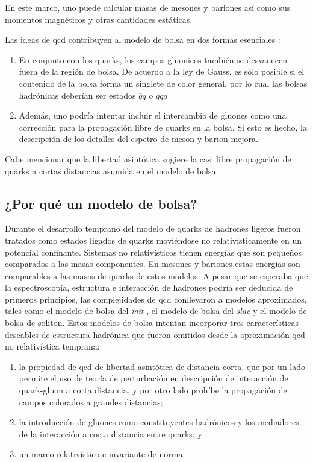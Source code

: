 En este marco, uno puede calcular masas de mesones y bariones así como sus momentos magnéticos y otras cantidades estáticas.

Las ideas de \acrshort{qcd} contribuyen al modelo de bolsa en dos formas esenciales \cite{Wilczek1982}:

\begin{enumerate}
\item En conjunto con los quarks, los campos gluonicos también se desvanecen fuera de la región de bolsa. De acuerdo a la ley de Gauss, es sólo posible si el contenido de la bolsa forma un singlete de color general, por lo cual las bolsas hadrónicas deberían ser estados $\bar{q}q$ o $qqq$
\item Además, uno podría intentar incluir el intercambio de gluones como una corrección para la propagación libre de quarks en la bolsa. Si esto es hecho, la descripción de los detalles del espetro de meson y barion mejora.
\end{enumerate}

Cabe mencionar que la libertad asintótica sugiere la casi libre propagación de quarks a cortas distancias asumida en el modelo de bolsa. 

\subsection{¿Por qué un modelo de bolsa?}

Durante el desarrollo temprano del modelo de quarks de hadrones ligeros fueron tratados como estados ligados de quarks moviéndose no relativísticamente en un potencial confinante. Sistemas no relativísticos tienen energías que son pequeños comparados a las masas componentes. En mesones y bariones estas energías son comparables a las masas de quarks de estos modelos. A pesar que se esperaba que la espectroscopía, estructura e interacción de hadrones podría ser deducida de primeros principios, las complejidades de \acrshort{qcd} conllevaron a modelos aproximados, tales como el modelo de bolsa del \emph{\acrfull{mit}} \cite{Johnson1975}, el modelo de bolsa del \emph{\acrfull{slac}} y el modelo de bolsa de soliton. Estos modelos de bolsa intentan incorporar tres características deseables de estructura hadrónica que fueron omitidos desde la aproximación \acrshort{qcd} no relativística temprana:

\renewcommand{\labelenumi}{\alph{enumi})}

\begin{enumerate}
\item la propiedad de \acrshort{qcd} de libertad asintótica de distancia corta, que por un lado permite el uso de teoría de perturbación en descripción de interacción de quark-gluon a corta distancia, y por otro lado prohíbe la propagación de campos colorados a grandes distancias;
\item la introducción de gluones como constituyentes hadrónicos y los mediadores de la interacción a corta distancia entre quarks; y
\item un marco relativístico e invariante de norma.
\end{enumerate}




